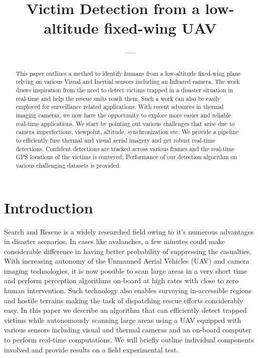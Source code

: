 \documentclass[runningheads]{llncs}
\begin{document}
\pagestyle{headings}

\mainmatter

\title{Victim Detection from a low-altitude fixed-wing UAV}

\author{-----}


\maketitle

\begin{abstract}
This paper outlines a method to identify humans from a low-altitude fixed-wing plane relying on various Visual and Inertial sensors including an Infrared camera. The work draws inspiration from the need to detect victims trapped in a disaster situation in real-time and help the rescue units reach them. Such a work can also be easily employed for surveillance related applications. With recent advances in thermal imaging cameras, we now have the opportunity to explore more easier and reliable real-time applications. We start by pointing out various challenges that arise due to camera imperfections, viewpoint, altitude, synchronization etc. We provide a pipeline to efficiently fuse thermal and visual aerial imagery and get robust real-time detections. Confident detections are tracked across various frames and the real-time GPS locations of the victims is conveyed. Performance of our detection algorithm on various challenging datasets is provided.
\end{abstract}


\section{Introduction}
Search and Rescue is a widely researched field owing to it's numerous advantages in disaster scenarios. In cases like avalanches, a few minutes could make considerable difference in having better probability of suppressing the casualties. With increasing autonomy of the Unmanned Aerial Vehicles (UAV) and camera imaging technologies, it is now possible to scan large areas in a very short time and perform perception algorithms on-board at high rates with close to zero human intervention. Such technology also enables surveying in-accessible regions and hostile terrains making the task of dispatching rescue efforts considerably easy. In this paper we describe an algorithm that can efficiently detect trapped victims while autonomously scanning large areas using a UAV equipped with various sensors including visual and thermal cameras and an on-board computer to perform real-time computations. We will briefly outline individual components involved and provide results on a field experimental test.
\end{document}
